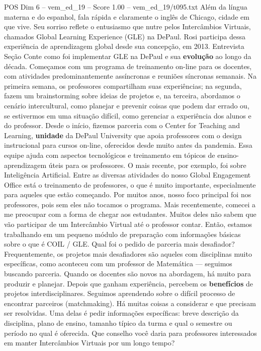 \begin{textsample}{POS Dim 6 – vem\_ed\_19 – Score 1.00 – vem\_ed\_19/t095.txt}
Além da língua materna e do espanhol, fala rápida e claramente o inglês de Chicago, cidade em que vive.
Seu sorriso reflete o entusiasmo que nutre pelos Intercâmbios Virtuais, chamados Global Learning Experience (GLE) na DePaul.
Rosi participa dessa experiência de aprendizagem global desde sua concepção, em 2013.
Entrevista Seção Conte como foi implementar GLE na DePaul e sua \textbf{evolução} ao longo da década.
Começamos com um programa de treinamento on-line para os docentes, com atividades predominantemente assíncronas e reuniões síncronas semanais.
Na primeira semana, os professores compartilham suas experiências; na segunda, fazem um brainstorming sobre ideias de projetos e, na terceira, abordamos o cenário intercultural, como planejar e prevenir coisas que podem dar errado ou, se estivermos em uma situação difícil, como gerenciar a experiência dos alunos e do professor.
Desde o início, fizemos parceria com o Center for Teaching and Learning, \textbf{unidade} da DePaul University que apoia professores com o design instrucional para cursos on-line, oferecidos desde muito antes da pandemia.
Essa equipe ajuda com aspectos tecnológicos e treinamento em tópicos de ensino-aprendizagem úteis para os professores.
O mais recente, por exemplo, foi sobre Inteligência Artificial.
Entre as diversas atividades do nosso Global Engagement Office está o treinamento de professores, o que é muito importante, especialmente para aqueles que estão começando.
Por muitos anos, nosso foco principal foi nos professores, pois sem eles não tocamos o programa.
Mais recentemente, comecei a me preocupar com a forma de chegar aos estudantes.
Muitos deles não sabem que vão participar de um Intercâmbio Virtual até o professor contar.
Então, estamos trabalhando em um pequeno módulo de preparação com informações básicas sobre o que é COIL / GLE.
Qual foi o pedido de parceria mais desafiador?
Frequentemente, os projetos mais desafiadores são aqueles com disciplinas muito específicas, como aconteceu com um professor de Matemática — seguimos buscando parceria.
Quando os docentes são novos na abordagem, há muito para produzir e planejar.
Depois que ganham experiência, percebem os \textbf{benefícios} de projetos interdisciplinares.
Seguimos aprendendo sobre o difícil processo de encontrar parceiros (matchmaking).
Há muitas coisas a considerar e que precisam ser resolvidas.
Uma delas é pedir informações específicas: breve descrição da disciplina, plano de ensino, tamanho típico da turma e qual o semestre ou período no qual é oferecida.
Que conselho você daria para professores interessados em manter Intercâmbios Virtuais por um longo tempo?

\end{textsample}
